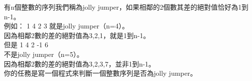 有n個整數的序列我們稱為jolly jumper，如果相鄰的2個數其差的絕對值恰好為1到n-1。\\
例如： 1 4 2 3 就是jolly jumper（n=4）。\\
因為相鄰2數的差的絕對值為3,2,1，就是1到n-1。\\
但是 1 4 2 -1 6\\
 不是jolly jumper（n=5）。\\
因為相鄰2數的差的絕對值為3,2,3,7，並非1到n-1。\\
 你的任務是寫一個程式來判斷一個整數序列是否為jolly  jumper。\\
